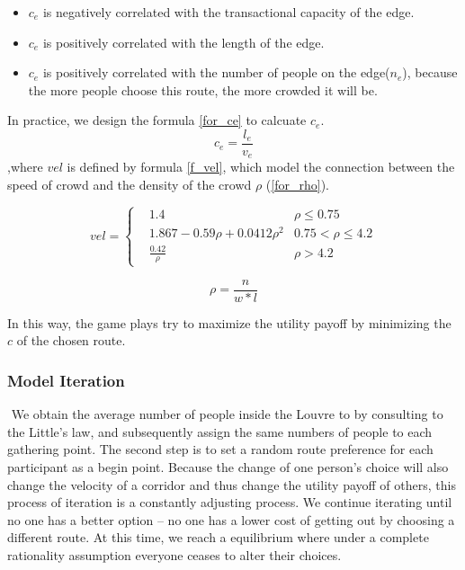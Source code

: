 \documentclass{mcmthesis}
\begin{document}
	\begin{itemize}
		\item $c_e$ is negatively correlated with the transactional capacity of the edge.
		\item $c_e$ is positively correlated with the length of the edge.
		\item $c_e$ is positively correlated with the number of people on the edge($n_e$),  because the more people choose this route, the more crowded it will be.
	\end{itemize}
	
	In practice, we design the  formula \ref{for_ce} to calcuate $c_e$.
	\begin{equation}
	c_e = \frac{l_e}{v_e}
	\label{for_ce}
	\end{equation}
	,where $vel$ is defined by formula \ref{f_vel}, which model the  connection between the speed of crowd  and the density of the crowd $\rho$ (\ref{for_rho}).
	
	\begin{equation}
	vel=\left\{
	\begin{aligned}
	&1.4 &  \rho \le 0.75 \\
	&1.867 - 0.59 \rho + 0.0412 \rho^2 &  0.75 < \rho \le 4.2 \\
	&\frac{0.42}{\rho} &  \rho > 4.2
	\end{aligned}
	\right .
	\label{f_vel}
	\end{equation}
	
	\begin{equation}
	\rho = \frac{n}{w*l}
	\label{for_rho}
	\end{equation}
	
	In this way, the game plays try to maximize the utility payoff by minimizing the $c$ of the chosen route.
	
	\subsubsection{Model Iteration}
	​       We obtain the average number of people inside the  Louvre to by consulting to the Little's law, and subsequently assign the same numbers of people to each gathering point. The second step is to set a random route preference for each participant as a begin point. Because the change of one person’s choice will also change the velocity of a corridor and thus change the utility payoff of others, this process of iteration is a constantly adjusting process. We continue iterating until no one has a better option – no one has a lower cost of getting out by choosing a different route. At this time, we reach a equilibrium where under a complete rationality assumption everyone ceases to alter their choices.
	
\end{document}
